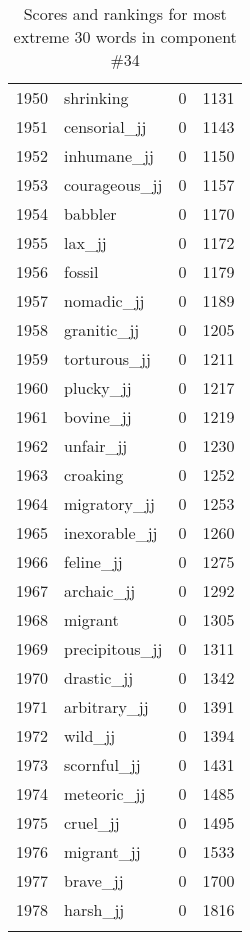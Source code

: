 \begin{longtable}[!htbp]{| rlr@{.}l |}
    1950 & shrinking & 0 & 1131 \\
    1951 & censorial\_jj & 0 & 1143 \\
    1952 & inhumane\_jj & 0 & 1150 \\
    1953 & courageous\_jj & 0 & 1157 \\
    1954 & babbler & 0 & 1170 \\
    1955 & lax\_jj & 0 & 1172 \\
    1956 & fossil & 0 & 1179 \\
    1957 & nomadic\_jj & 0 & 1189 \\
    1958 & granitic\_jj & 0 & 1205 \\
    1959 & torturous\_jj & 0 & 1211 \\
    1960 & plucky\_jj & 0 & 1217 \\
    1961 & bovine\_jj & 0 & 1219 \\
    1962 & unfair\_jj & 0 & 1230 \\
    1963 & croaking & 0 & 1252 \\
    1964 & migratory\_jj & 0 & 1253 \\
    1965 & inexorable\_jj & 0 & 1260 \\
    1966 & feline\_jj & 0 & 1275 \\
    1967 & archaic\_jj & 0 & 1292 \\
    1968 & migrant & 0 & 1305 \\
    1969 & precipitous\_jj & 0 & 1311 \\
    1970 & drastic\_jj & 0 & 1342 \\
    1971 & arbitrary\_jj & 0 & 1391 \\
    1972 & wild\_jj & 0 & 1394 \\
    1973 & scornful\_jj & 0 & 1431 \\
    1974 & meteoric\_jj & 0 & 1485 \\
    1975 & cruel\_jj & 0 & 1495 \\
    1976 & migrant\_jj & 0 & 1533 \\
    1977 & brave\_jj & 0 & 1700 \\
    1978 & harsh\_jj & 0 & 1816 \\
    \hline
    \caption{Scores and rankings for most extreme 30 words in component \#34} \\
\end{longtable}
